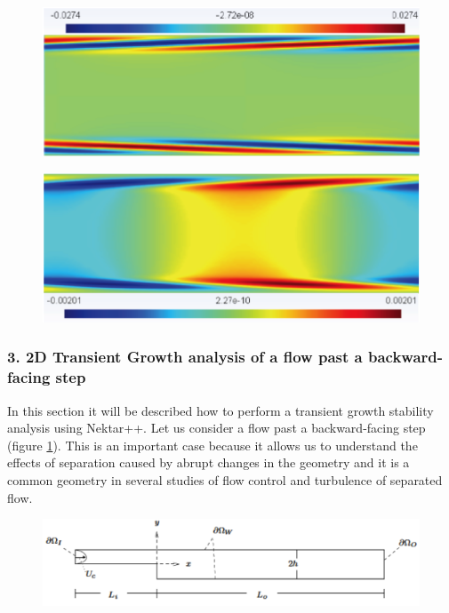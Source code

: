 \begin{figure}[!htbp]
\centering
 {\includegraphics[width=1 \textwidth]{Figures/chan_u_adj.png}}
   \caption {}
\end{figure}

\begin{figure}[!htbp]
\centering
 {\includegraphics[width=1 \textwidth]{Figures/chan_v_adj}}
    \caption {}
\end{figure}

\subsubsection{3.  2D Transient Growth analysis of a flow past a backward-facing step}

In this section it will be described how to perform a transient growth stability analysis using Nektar++. Let us consider a flow past a backward-facing step (figure \ref{bfs_geo}). This is an important case because it allows us to understand  the effects of separation caused by abrupt changes in the geometry and it is a common geometry in several studies of flow control and turbulence of separated flow.

\begin{figure}[!htbp]
\centering
 {\includegraphics[width=1 \textwidth]{Figures/bfs_geo}}
    \caption {}\label{bfs_geo}
\end{figure}

